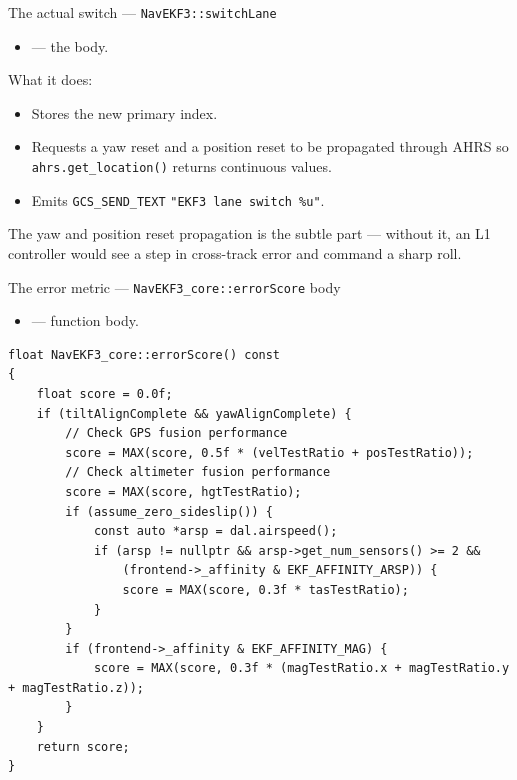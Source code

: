\documentclass[aspectratio=169,11pt]{beamer}
\begin{document}
\begin{frame}[allowframebreaks]{The actual switch --- \texttt{NavEKF3::switchLane}}
  \begin{itemize}
    \item {} --- the body.
  \end{itemize}
  \vfill
  What it does:
  \begin{itemize}
    \item Stores the new primary index.
    \item Requests a yaw reset and a position reset to be propagated through AHRS so \texttt{ahrs.get\_location()} returns continuous values.
    \item Emits \texttt{GCS\_SEND\_TEXT} \texttt{"EKF3 lane switch \%u"}.
  \end{itemize}
  \vfill
  The yaw and position reset propagation is the subtle part --- without it, an L1 controller would see a step in cross-track error and command a sharp roll.
\end{frame}

\begin{frame}[fragile]{The error metric --- \texttt{NavEKF3\_core::errorScore} body}
  \begin{itemize}
    \item {} --- function body.
  \end{itemize}
  \begin{Verbatim}[fontsize=\scriptsize,frame=single]
float NavEKF3_core::errorScore() const
{
    float score = 0.0f;
    if (tiltAlignComplete && yawAlignComplete) {
        // Check GPS fusion performance
        score = MAX(score, 0.5f * (velTestRatio + posTestRatio));
        // Check altimeter fusion performance
        score = MAX(score, hgtTestRatio);
        if (assume_zero_sideslip()) {
            const auto *arsp = dal.airspeed();
            if (arsp != nullptr && arsp->get_num_sensors() >= 2 &&
                (frontend->_affinity & EKF_AFFINITY_ARSP)) {
                score = MAX(score, 0.3f * tasTestRatio);
            }
        }
        if (frontend->_affinity & EKF_AFFINITY_MAG) {
            score = MAX(score, 0.3f * (magTestRatio.x + magTestRatio.y + magTestRatio.z));
        }
    }
    return score;
}
  \end{Verbatim}
\end{frame}
\end{document}
